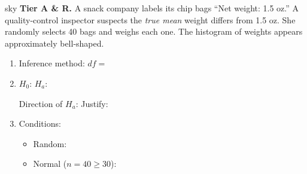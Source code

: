 \documentclass[10pt]{article}
\begin{document}
\begin{scenariobox}{sky}
\textbf{Tier A \& R.} \quad
A snack company labels its chip bags ``Net weight: 1.5 oz.'' A quality-control inspector
suspects the \emph{true mean} weight differs from 1.5 oz. She randomly selects 40 bags and
weighs each one. The histogram of weights appears approximately bell-shaped.

\begin{enumerate}[label=\alph*.]
  \item Inference method:  \quad $df = $ 
  \item $H_0$:  \quad $H_a$: 

        Direction of $H_a$:  \quad Justify: 

  \item Conditions:
        \begin{itemize}
          \item Random: 
          \item Normal ($n = 40 \ge 30$): 
        \end{itemize}
\end{enumerate}
\end{scenariobox}
\end{document}
